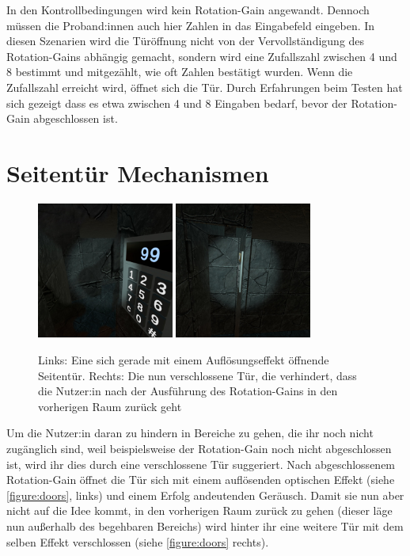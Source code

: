 In den Kontrollbedingungen wird kein Rotation-Gain angewandt. Dennoch müssen die Proband:innen auch hier Zahlen in das Eingabefeld eingeben. In diesen Szenarien wird die Türöffnung nicht von der Vervollständigung des Rotation-Gains abhängig gemacht, sondern wird eine Zufallszahl zwischen 4 und 8 bestimmt und mitgezählt, wie oft Zahlen bestätigt wurden. Wenn die Zufallszahl erreicht wird, öffnet sich die Tür. Durch Erfahrungen beim Testen hat sich gezeigt dass es etwa zwischen 4 und 8 Eingaben bedarf, bevor der Rotation-Gain abgeschlossen ist.

\section{Seitentür Mechanismen}
\begin{figure}[!h]
    \centering
    \includegraphics[width=0.4\textwidth]{vrscreenshots/dissolve.jpg}
    \includegraphics[width=0.4\textwidth]{vrscreenshots/reverseddoor.jpg}
    \caption{Links: Eine sich gerade mit einem Auflösungseffekt öffnende Seitentür. Rechts: Die nun verschlossene Tür, die verhindert, dass die Nutzer:in nach der Ausführung des Rotation-Gains in den vorherigen Raum zurück geht}\label{figure:doors}
\end{figure}

Um die Nutzer:in daran zu hindern in Bereiche zu gehen, die ihr noch nicht zugänglich sind, weil beispielsweise der Rotation-Gain noch nicht abgeschlossen ist, wird ihr dies durch eine verschlossene Tür suggeriert. Nach abgeschlossenem Rotation-Gain öffnet die Tür sich mit einem auflösenden optischen Effekt (siehe \autoref{figure:doors}, links) und einem Erfolg andeutenden Geräusch. Damit sie nun aber nicht auf die Idee kommt, in den vorherigen Raum zurück zu gehen (dieser läge nun außerhalb des begehbaren Bereichs) wird hinter ihr eine weitere Tür mit dem selben Effekt verschlossen (siehe \autoref{figure:doors} rechts).

